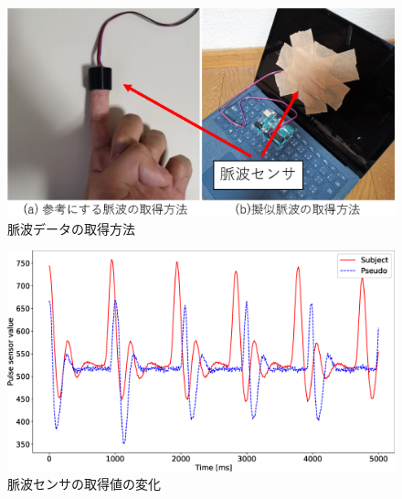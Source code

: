 \documentclass[submit,techrep]{ipsj}
\begin{document}
\begin{figure}[!t]
	\begin{center}
		\includegraphics[width=1\linewidth]{sensors.eps}
	\end{center}
	\vspace{-8mm}
	\caption{脈波データの取得方法}
	\label{fig:sensors}
\end{figure}

\begin{figure}[!t]
	\begin{center}
		\includegraphics[width=1\linewidth]{pulse.eps}
	\end{center}
	\vspace{-8mm}
	\caption{脈波センサの取得値の変化}
	\label{fig:pulse}
\end{figure}







\end{document}
